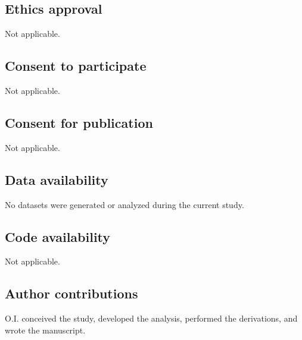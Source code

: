\documentclass[11pt, a4paper]{article}
\theoremstyle{definition}
\theoremstyle{plain}
\theoremstyle{remark}
\numberwithin{equation}{section}
\begin{document}
    \subsection*{Ethics approval}
        Not applicable.
    
    \subsection*{Consent to participate}
        Not applicable.
    
    \subsection*{Consent for publication}
        Not applicable.
    
    \subsection*{Data availability}
        No datasets were generated or analyzed during the current study.
    
    \subsection*{Code availability}
        Not applicable.
    
    \subsection*{Author contributions}
        O.I. conceived the study, developed the analysis, performed the derivations, and wrote the manuscript.
\end{document}
